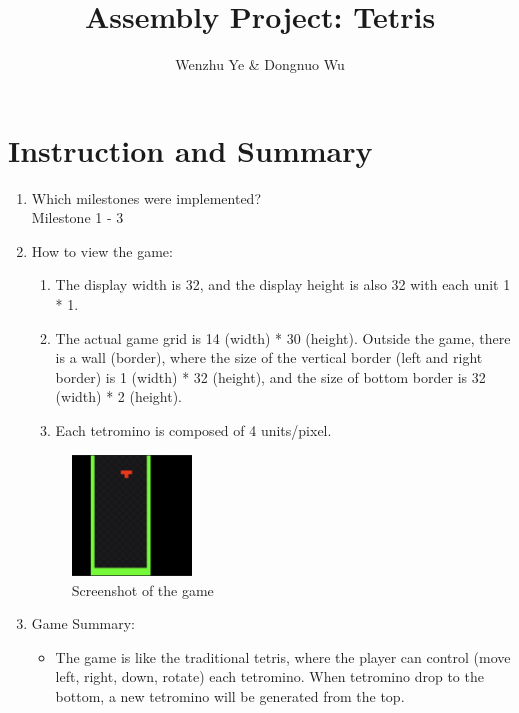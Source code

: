 \documentclass{article}
\title{Assembly Project: Tetris}
\author{Wenzhu Ye & Dongnuo Wu}
\begin{document}
\maketitle

\section{Instruction and Summary}

\begin{enumerate}

    \item Which milestones were implemented? \\
    Milestone 1 - 3

    \item How to view the game:
    
    \begin{enumerate}

    \item The display width is 32, and the display height is also 32 with each unit 1 * 1.
    \item The actual game grid is 14 (width) * 30 (height). Outside the game, there is a wall (border), where the size of the vertical border (left and right border) is 1 (width) * 32 (height), and the size of bottom border is 32 (width) * 2 (height).
    \item Each tetromino is composed of 4 units/pixel.


    \end{enumerate}

    

\begin{figure}[ht!]
    \centering
    \includegraphics[width=0.3\textwidth]{game_screenshot.png}
    \caption{Screenshot of the game}
    \label{Instructions}
\end{figure}

\item Game Summary:
\begin{itemize}
\item The game is like the traditional tetris, where the player can control (move left, right, down, rotate) each tetromino. When tetromino drop to the bottom, a new tetromino will be generated from the top.
\end{itemize}

    
\end{enumerate}
\end{document}
